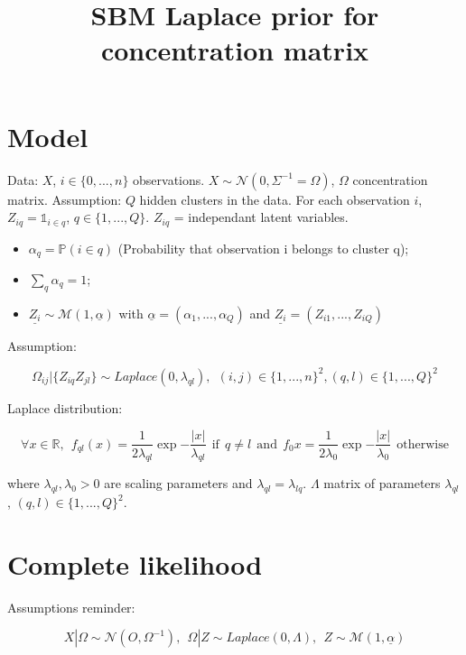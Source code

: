 \documentclass[10pt]{article}
\title{SBM Laplace prior for concentration matrix}
\begin{document}
\newcommand*{\norm}[1]{\left\lVert{#1}\right\rVert}

\maketitle

\section{Model}

Data: $X$, $i\in \{ 0,...,n \}$ observations. $X \sim \mathcal{N}(0, \Sigma^{-1} = \Omega)$, $\Omega$ concentration matrix. Assumption: $Q$ hidden clusters in the data. For each observation $i$, $Z_{iq} = \mathds{1}_{i\in q}$, $ q\in \{ 1,...,Q \}$. $Z_{iq}$ = independant latent variables.

\begin{itemize}
	\item $\alpha_q = \mathbb{P}(i\in q)$ (Probability that observation i belongs to cluster q); 
	\item $\sum_q \alpha_q = 1 $;
	\item $ \underline{Z_i} \sim \mathcal{M}(1, \underline{\alpha})$ with $\underline{\alpha} = (\alpha_1, ..., \alpha_Q)$  and $\underline{Z_i} = (Z_{i1}, ..., Z_{iQ})$
\end{itemize}

Assumption: 

\[ \Omega_{ij}| \{ Z_{iq}Z_{jl} \} \sim Laplace(0, \lambda_{ql}), ~~ (i,j) \in \{ 1,...,n \}^2, (q,l)\in \{ 1,...,Q \}^2 \]

Laplace distribution: 

\[ \forall x \in \mathbb{R},~~ 
f_{ql}(x) = \frac{1}{2\lambda_{ql}} \exp{-\frac{|x|}{\lambda_{ql}}} ~~ \text{if} ~~ q \neq l 
~~\text{and} ~~
f_0{x} = \frac{1}{2\lambda_{0}} \exp{-\frac{|x|}{\lambda_{0}}} ~~ \text{otherwise}\]

where $\lambda_{ql}, \lambda_0 > 0$ are scaling parameters and $\lambda_{ql} = \lambda_{lq}$. $\Lambda$ matrix of parameters $\lambda_{ql}$, $(q,l) \in \{1,...,Q\}^2$.



\section{Complete likelihood}

Assumptions reminder:

\[ X|\Omega \sim \mathcal{N}(O, \Omega^{-1}),~~ \Omega|Z \sim Laplace(0, \Lambda),~~ Z \sim \mathcal{M}(1,\underline{\alpha}) \]
\end{document}
